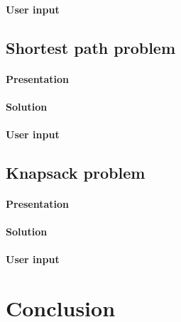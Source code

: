 \documentclass[a4paper, 11pt]{article}
\begin{document}
            \paragraph{User input}
       \subsection{Shortest path problem}
            \paragraph{Presentation}
            \paragraph{Solution}
            \paragraph{User input}
       \subsection{Knapsack problem}
            \paragraph{Presentation}
            \paragraph{Solution}
            \paragraph{User input}

    \section*{Conclusion}
\end{document}
